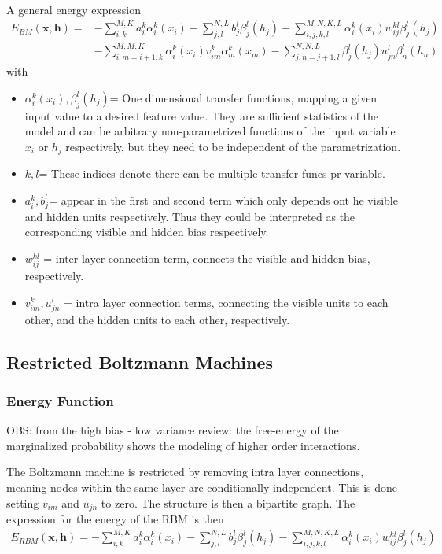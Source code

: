 \documentclass[twoside,english]{uiofysmaster}
\begin{document}
A general energy expression
\begin{align}
	E_{BM}(\bm{x}, \bm{h}) =& - \sum_{i, k}^{M, K} a_i^k \alpha_i^k (x_i)
	- \sum_{j, l}^{N, L} b_j^l \beta_j^l (h_j) 
	- \sum_{i,j,k,l}^{M,N,K,L} \alpha_i^k (x_i) w_{ij}^{kl} \beta_j^l (h_j) \nonumber \\
	&- \sum_{i, m=i+1, k}^{M, M, K} \alpha_i^k (x_i) v_{im}^k \alpha_m^k (x_m)
	- \sum_{j,n=j+1,l}^{N,N,L} \beta_j^l (h_j) u_{jn}^l \beta_n^l (h_n)
\end{align}
with
\begin{itemize}
	\item $\alpha_i^k (x_i), \beta_j^l (h_j) $= One dimensional transfer functions, mapping a given input value to a desired feature value. They are sufficient statistics of the model and can be arbitrary non-parametrized functions of the input variable $x_i$ or $h_j$ respectively, but they need to be independent of the parametrization.
	\item $k, l $= These indices denote there can be multiple transfer funcs pr variable.
	\item $a_i^k,  b_j^l$= appear in the first and second term which only depends ont he visible and hidden units respectively. Thus they could be interpreted as the corresponding visible and hidden bias respectively.
	\item $w_{ij}^{kl}$ = inter layer connection term, connects the visible and hidden bias, respectively.
	\item $ v_{im}^k, u_{jn}^l$ = intra layer connection terms, connecting the visible units to each other, and the hidden units to each other, respectively.
\end{itemize}

\subsection{Restricted Boltzmann Machines}
\subsubsection{Energy Function}
OBS: from the high bias - low variance review: the free-energy of the marginalized probability shows the modeling of higher order interactions.

The Boltzmann machine is restricted by removing intra layer connections, meaning nodes within the same layer are conditionally independent. This is done setting $v_{im}$ and $u_{jn}$ to zero. The structure is then a bipartite graph. The expression for the energy of the RBM is then
\begin{align}
	E_{RBM}(\bm{x}, \bm{h}) = - \sum_{i, k}^{M, K} a_i^k \alpha_i^k (x_i)
	- \sum_{j, l}^{N, L} b_j^l \beta_j^l (h_j) 
	- \sum_{i,j,k,l}^{M,N,K,L} \alpha_i^k (x_i) w_{ij}^{kl} \beta_j^l (h_j)
\end{align}
\end{document}
